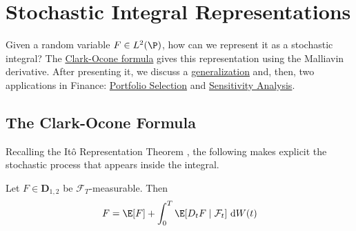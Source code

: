 \chapter{Stochastic Integral Representations}

Given a random variable $F \in L^2(\P)$, how can we represent it as a stochastic integral? The \hyperref[clark-ocone]{Clark-Ocone formula} gives this representation using the Malliavin derivative. After presenting it, we discuss a \hyperref[co-change-measure]{generalization} and, then, two applications in Finance: \hyperref[portfolio-selection]{Portfolio Selection} and \hyperref[sensitivity-analysis]{Sensitivity Analysis}. 

\section{The Clark-Ocone Formula}\label{clark-ocone}

Recalling the Itô Representation Theorem \cite[Theorem 4.3.3]{oksendal2013stochastic}, the following makes explicit the stochastic process that appears inside the integral. 

\begin{theorem}\label{thm:clark-ocone}
	Let $F \in \mathbf{D}_{1,2}$ be $\mathcal{F}_T$-measurable. Then
	\begin{equation}
		F = \E[F] + \int_0^T \E[D_t F \mid \mathcal{F}_t] ~\mathrm{d}W(t)
	\end{equation}
\end{theorem}

